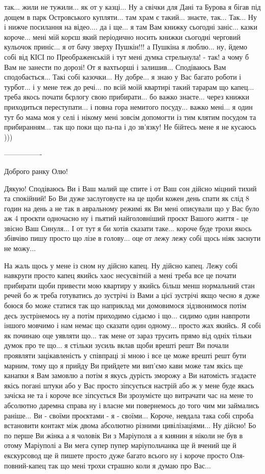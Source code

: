 так... жили не тужили... як от у казці...  Ну а свічки для Дані та Бурова я
бігав під дощем в парк Островського купляти... там храм є такий... знаєте,
так... Так... Ну і нижче посилання на відео.... да і ще...  я там Вам книжку
сьогодні заніс... казки короче... мені мій корєш який періодично носить книжки
сьогодні черговий кульочок приніс... я от бачу зверху Пушкін!!! а Пушкіна я
люблю... ну, йдемо собі від КІСІ по Преображенській і тут мені думка
стрельнула! - так!  а чому б Вам не занести по дорозі! От я вахтьорші і
залишив...  Сподіваюсь Вам сподобається... Такі собі казочки... Ну добре... я
знаю у Вас багато роботи і турбот... і у мене теж до речі...  по всій моїй
квартирі такий тарарам що капец... треба якось почати бєрлогу свою прибирати...
бо важко знаєте... через книжки приходиться переступати... і повна гора
немитого посуду... важко мені... я один тут бо мама моя у селі і нікому мені
зовсім допомогти із тим клятим посудом та прибиранням...  так що поки що па-па
і до зв'язку!  Не бійтесь мене я не кусаюсь )))  

----------------

Доброго ранку Олю!

Дякую! Сподіваюсь Ви і Ваш малий ще спите і от Ваш сон дійсно міцний тихий та
спокійний!  Бо Ви дуже заслуговуєте на це щоби кожен день спати як слід 8 годин
на день а не так в авральному режимі як Ви мені описували що у Вас було аж 4
проєкти одночасно ну і пьятий найголовніший проєкт Вашого життя - це звісно Ваш
Синуля...  І от тут я би хотів сказати таке... короче буде трохи якось збівчіво
пишу просто що лізе в голову...  оце от лежу лежу собі щось ніяк заснути не
можу...

На жаль щось у мене із сном ну дійсно капец. Ну дійсно капец. Лежу собі
навкруги просто капец якийсь хаос несусвітній а мені треба все це почати
прибирати щоби привести мою квартиру у якийсь більш менш нормальний стан речей
бо ж треба готуватись до зустрічі із Вами а цієї зустрічі якщо чесно я дуже
боюся бо може статися так що наприклад ми домовимося зідзвонимося потім десь
зустрінемось ну а потім приходимо сідаємо і що... сидимо один навпроти іншого
мовчимо і нам немає що сказати один одному... просто жах якийсь. Я собі як
починаю оце уявляти що... так мене от зараз трусить прямо від одніх тільки
думок про те що...  я стільки зусиль вклав щоби врешті решт Ви почали проявляти
зацікавленість у співпраці зі мною і все це може врешті решт бути марним, тому
що я прийду Ви прийдете ми вип'ємо кави може там якісь ще канапки я Вам замовлю
а потім я якусь дурість зморожу а Ви натомість згадаєте якісь погані штуки або
у Вас просто зіпсується настрій або ж у мене буде якась зачіска не та і короче
все зіпсується Ви зрозумієте що витрачати час на мене то абсолютно даремна
справа ну і власне ми повернемось до того чим ми займались раніше...  Ви -
своїми проєктами - я - своїми... Короче, невдала така собі спроба встановити
контакт між двома абсолютно різними цивілізаціями... Ну дійсно!  Бо по перше Ви
жінка а я чоловік Ви з Маріуполя а я киянин я ніколи не був в отому Маріуполі а
Ви мега супер пупер маріупольчанка ще й вчений ще й екскурсовод ще й пишете
просто дуже багато всього ну і короче просто Оля-повний-капец так що мені трохи
страшно коли я думаю про Вас...

